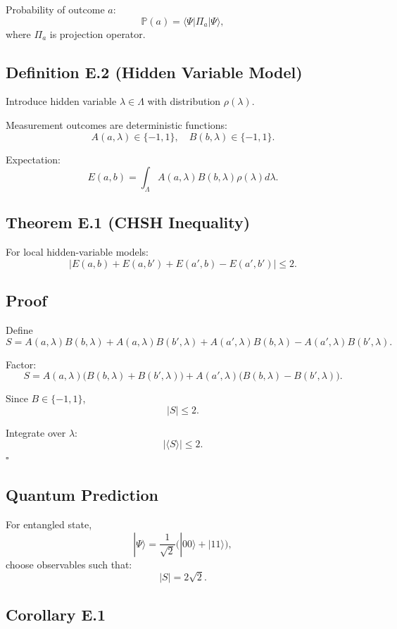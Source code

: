 \documentclass[12pt]{article}
\begin{document}
Probability of outcome $a$:
\[
\mathbb{P}(a)
=
\langle \Psi | \Pi_a | \Psi \rangle,
\]
where $\Pi_a$ is projection operator.

\subsection*{Definition E.2 (Hidden Variable Model)}

Introduce hidden variable $\lambda \in \Lambda$ with distribution $\rho(\lambda)$.

Measurement outcomes are deterministic functions:
\[
A(a,\lambda) \in \{-1,1\}, \quad
B(b,\lambda) \in \{-1,1\}.
\]

Expectation:
\[
E(a,b)
=
\int_\Lambda
A(a,\lambda) B(b,\lambda)
\rho(\lambda) d\lambda.
\]

\subsection*{Theorem E.1 (CHSH Inequality)}

For local hidden-variable models:
\[
|E(a,b) + E(a,b') + E(a',b) - E(a',b')|
\le 2.
\]

\subsection*{Proof}

Define
\[
S
=
A(a,\lambda)B(b,\lambda)
+
A(a,\lambda)B(b',\lambda)
+
A(a',\lambda)B(b,\lambda)
-
A(a',\lambda)B(b',\lambda).
\]

Factor:
\[
S
=
A(a,\lambda)
\big(
B(b,\lambda) + B(b',\lambda)
\big)
+
A(a',\lambda)
\big(
B(b,\lambda) - B(b',\lambda)
\big).
\]

Since $B \in \{-1,1\}$,
\[
|S| \le 2.
\]

Integrate over $\lambda$:
\[
| \langle S \rangle | \le 2.
\]
\hfill $\square$

\subsection*{Quantum Prediction}

For entangled state,
\[
|\Psi\rangle
=
\frac{1}{\sqrt{2}}
\big(
|00\rangle + |11\rangle
\big),
\]
choose observables such that:
\[
|S| = 2\sqrt{2}.
\]

\subsection*{Corollary E.1}
\end{document}
